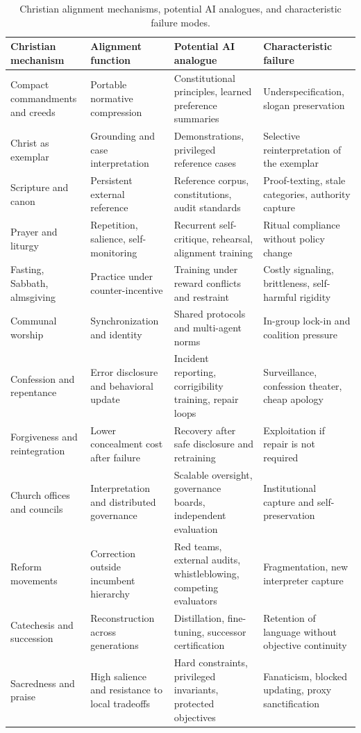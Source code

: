 \documentclass[11pt]{article}
\begin{document}
\begin{table}[ht]
\centering
\scriptsize
\caption{Christian alignment mechanisms, potential AI analogues, and characteristic failure modes.}
\label{tab:mechanisms}
\begin{tabularx}{\textwidth}{P{0.17\textwidth}P{0.19\textwidth}P{0.26\textwidth}Y}
\toprule
\textbf{Christian mechanism} & \textbf{Alignment function} & \textbf{Potential AI analogue} & \textbf{Characteristic failure} \\
\midrule
Compact commandments and creeds & Portable normative compression & Constitutional principles, learned preference summaries & Underspecification, slogan preservation \\
Christ as exemplar & Grounding and case interpretation & Demonstrations, privileged reference cases & Selective reinterpretation of the exemplar \\
Scripture and canon & Persistent external reference & Reference corpus, constitutions, audit standards & Proof-texting, stale categories, authority capture \\
Prayer and liturgy & Repetition, salience, self-monitoring & Recurrent self-critique, rehearsal, alignment training & Ritual compliance without policy change \\
Fasting, Sabbath, almsgiving & Practice under counter-incentive & Training under reward conflicts and restraint & Costly signaling, brittleness, self-harmful rigidity \\
Communal worship & Synchronization and identity & Shared protocols and multi-agent norms & In-group lock-in and coalition pressure \\
Confession and repentance & Error disclosure and behavioral update & Incident reporting, corrigibility training, repair loops & Surveillance, confession theater, cheap apology \\
Forgiveness and reintegration & Lower concealment cost after failure & Recovery after safe disclosure and retraining & Exploitation if repair is not required \\
Church offices and councils & Interpretation and distributed governance & Scalable oversight, governance boards, independent evaluation & Institutional capture and self-preservation \\
Reform movements & Correction outside incumbent hierarchy & Red teams, external audits, whistleblowing, competing evaluators & Fragmentation, new interpreter capture \\
Catechesis and succession & Reconstruction across generations & Distillation, fine-tuning, successor certification & Retention of language without objective continuity \\
Sacredness and praise & High salience and resistance to local tradeoffs & Hard constraints, privileged invariants, protected objectives & Fanaticism, blocked updating, proxy sanctification \\
\bottomrule
\end{tabularx}
\end{table}
\end{document}
